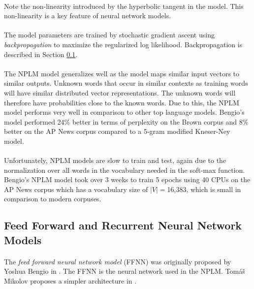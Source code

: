 \paragraph{}
Note the non-linearity introduced by the hyperbolic tangent in the model. This non-linearity is a key feature of neural network models.
\paragraph{}
The model parameters are trained by stochastic gradient ascent using \emph{backpropagation} to maximize the regularized log likelihood. Backpropagation is described in Section \ref{sec:FFNNRNN}.
\paragraph{}
The NPLM model generalizes well as the model maps similar input vectors to similar outputs. Unknown words that occur in similar contexts as training words will have similar distributed vector representations. The unknown words will therefore have probabilities close to the known words.  Due to this, the NPLM model performs very well in comparison to other top language models. Bengio's model performed 24\% better in terms of perplexity on the Brown corpus and 8\% better on the AP News corpus compared to a 5-gram modified Kneser-Ney model.
\paragraph{}
Unfortunately, NPLM models are slow to train and test, again due to the normalization over all words in the vocabulary needed in the soft-max function. Bengio's NPLM model took over 3 weeks to train 5 epochs using 40 CPUs on the AP News corpus which has a vocabulary size of $|V|=$16,383, which is small in comparison to modern corpuses.

\subsection{Feed Forward and Recurrent Neural Network Models} \label{sec:FFNNRNN}
\paragraph{}
The \emph{feed forward neural network model} (FFNN) was originally proposed by Yoshua Bengio in \cite{Bengio2003}. The FFNN is the neural network used in the NPLM. Tom{\'a}\v{s} Mikolov proposes a simpler architecture in \cite{Mikolov2009}.

